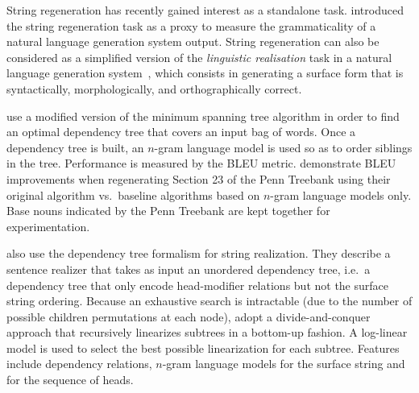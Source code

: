 String regeneration has recently gained interest as
a standalone
task.%
%
%
%
\citet{wan-dras-dale-paris:2009:EACL} introduced the string regeneration
task as a proxy to measure the grammaticality of a
natural language generation system output.
String regeneration can also be considered as a simplified version
of the \emph{linguistic realisation} task in a natural language
generation system~\citep{reiter-dale:1997:JNLE}, which consists in
generating a surface form that is syntactically, morphologically,
and orthographically correct.

\citet{wan-dras-dale-paris:2009:EACL} use a
modified version of the minimum spanning tree algorithm
in order to find an optimal dependency tree that covers an input bag of words.
Once a dependency tree is built, an $n$-gram language model is used
so as to order siblings in the tree.
Performance is measured by the BLEU metric.
\citet{wan-dras-dale-paris:2009:EACL} demonstrate BLEU
improvements when regenerating Section 23 of the
Penn Treebank using their original algorithm vs.\ baseline
algorithms based on $n$-gram language models only. Base nouns
indicated by the Penn Treebank are kept together for experimentation.


\citet{he-wang-guo-liu:2009:ACLIJCNLP} also use the dependency tree
formalism for string realization. They describe a sentence
realizer that takes as input an unordered dependency tree, i.e.\ a dependency
tree that only encode head-modifier relations but not the surface
string ordering. Because an exhaustive search is intractable (due to
the number of possible children permutations at each node), \citet{he-wang-guo-liu:2009:ACLIJCNLP}
adopt a divide-and-conquer approach that recursively linearizes
subtrees in a bottom-up fashion. A log-linear model is used
to select the best possible linearization for each subtree.
Features include dependency relations, $n$-gram language models
for the surface string and for the sequence of heads.

